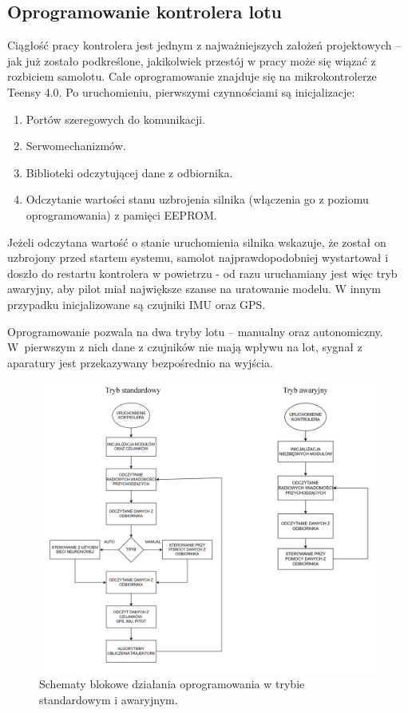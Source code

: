 \documentclass[12pt, a4paper]{article}
\begin{document}
 \clearpage
\subsection{Oprogramowanie kontrolera lotu}
Ciągłość pracy kontrolera jest jednym z najważniejszych założeń projektowych – jak już zostało podkreślone, jakikolwiek przestój w pracy może się wiązać z rozbiciem samolotu. Całe oprogramowanie znajduje się na mikrokontrolerze Teensy 4.0. Po uruchomieniu, pierwszymi czynnościami są inicjalizacje:
\begin{enumerate}

\item Portów szeregowych do komunikacji.
\item Serwomechanizmów.
\item Biblioteki odczytującej dane z odbiornika.
\item Odczytanie wartości stanu uzbrojenia silnika (włączenia go z poziomu oprogramowania) z pamięci EEPROM.

\end{enumerate}

Jeżeli odczytana wartość o stanie uruchomienia silnika wskazuje, że został on uzbrojony przed startem systemu, samolot najprawdopodobniej wystartował i doszło do restartu kontrolera w powietrzu - od razu uruchamiany jest więc tryb awaryjny, aby pilot miał największe szanse na uratowanie modelu. W innym przypadku inicjalizowane są czujniki IMU oraz GPS.

Oprogramowanie pozwala na dwa tryby lotu – manualny oraz autonomiczny. W~pierwszym z nich dane z czujników nie mają wpływu na lot, sygnał z aparatury jest przekazywany bezpośrednio na wyjścia.
 
\begin{figure}[ht]
    \centering
    \includegraphics[width=1\textwidth]{diagramy}
    \caption{Schematy blokowe działania oprogramowania w trybie standardowym i awaryjnym.}
\end{figure}
\end{document}
